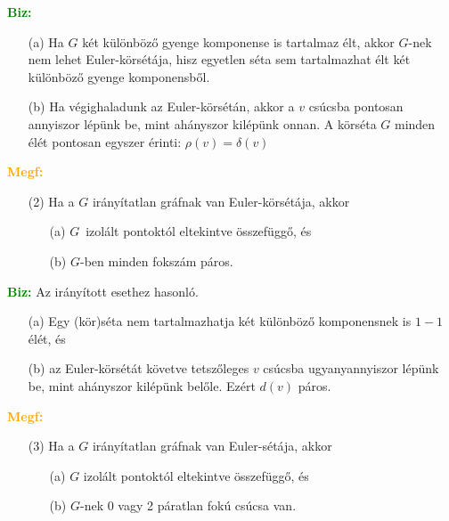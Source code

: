 \documentclass[../../szobeli.tex]{subfiles}
\begin{document}
\begin{itemize}
        \textcolor{green}{\textbf{Biz:}} \begin{itemize}
            \item[(a)] Ha $G$ két különböző gyenge komponense is tartalmaz élt, akkor $G$-nek nem lehet Euler-körsétája, hisz egyetlen séta sem tartalmazhat élt két különböző gyenge komponensből. \checkmark
            \item[(b)] Ha végighaladunk az Euler-körsétán, akkor a $v$ csúcsba pontosan annyiszor lépünk be, mint ahányszor kilépünk onnan. A körséta $G$ minden élét pontosan egyszer érinti: $\rho(v) = \delta(v)$   
        \end{itemize}
        
        \textcolor{orange}{\textbf{Megf:}} \begin{itemize}
            \item[(2)] Ha a $G$ irányítatlan gráfnak van Euler-körsétája, akkor \begin{itemize}
                \item[(a)] $G$ izolált pontoktól eltekintve összefüggő, és
                \item[(b)] $G$-ben minden fokszám páros.
            \end{itemize}
        \end{itemize}

        \textcolor{green}{\textbf{Biz:}} Az irányított esethez hasonló. \begin{itemize}
            \item[(a)] Egy (kör)séta nem tartalmazhatja két különböző komponensnek is $1-1$ élét, és
            \item[(b)] az Euler-körsétát követve tetszőleges $v$ csúcsba ugyanyannyiszor lépünk be, mint ahányszor kilépünk belőle. Ezért $d(v)$ páros.   
        \end{itemize}
        
        \textcolor{orange}{\textbf{Megf:}} \begin{itemize}
            \item[(3)] Ha a $G$ irányítatlan gráfnak van Euler-sétája, akkor \begin{itemize}
                \item[(a)] $G$ izolált pontoktól eltekintve összefüggő, és
                \item[(b)] $G$-nek 0 vagy 2 páratlan fokú csúcsa van.
            \end{itemize}
        \end{itemize}
        

\end{itemize}
\end{document}
